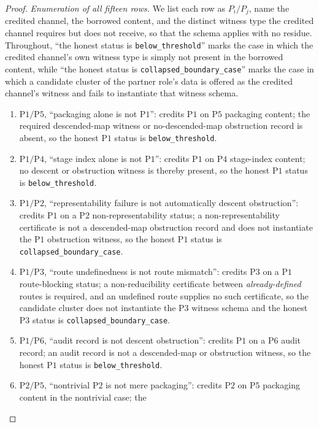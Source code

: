 \documentclass[11pt]{article}
\theoremstyle{definition}
\newcommand{\belowthr}{\texttt{below\_threshold}}
\newcommand{\collapsedbc}{\texttt{collapsed\_boundary\_case}}
\newcommand{\Pone}{\ensuremath{\mathrm{P1}}}
\newcommand{\Ptwo}{\ensuremath{\mathrm{P2}}}
\newcommand{\Pthree}{\ensuremath{\mathrm{P3}}}
\newcommand{\Pfour}{\ensuremath{\mathrm{P4}}}
\newcommand{\Pfive}{\ensuremath{\mathrm{P5}}}
\newcommand{\Psix}{\ensuremath{\mathrm{P6}}}
\begin{document}
\begin{proof}
\emph{Enumeration of all fifteen rows.} We list each row as
\(P_i/P_j\), name the credited channel, the borrowed content, and the
distinct witness type the credited channel requires but does not receive, so
that the schema applies with no residue. Throughout, ``the honest status is
\belowthr{}'' marks the case in which the credited channel's own witness type is
simply not present in the borrowed content, while ``the honest status is
\collapsedbc{}'' marks the case in which a candidate cluster of the partner
role's data is offered as the credited channel's witness and fails to
instantiate that witness schema.
\begin{enumerate}[topsep=2pt,itemsep=2pt,label=\textup{(\arabic*)}]
  \item \(\Pone{}/\Pfive{}\), ``packaging alone is not \Pone{}'': credits
    \Pone{} on \Pfive{} packaging content; the required descended-map witness
    or no-descended-map obstruction record is absent, so the honest \Pone{}
    status is \belowthr{}.
  \item \(\Pone{}/\Pfour{}\), ``stage index alone is not \Pone{}'': credits
    \Pone{} on \Pfour{} stage-index content; no descent or obstruction witness
    is thereby present, so the honest \Pone{} status is \belowthr{}.
  \item \(\Pone{}/\Ptwo{}\), ``representability failure is not automatically
    descent obstruction'': credits \Pone{} on a \Ptwo{} non-representability
    status; a non-representability certificate is not a descended-map
    obstruction record and does not instantiate the \Pone{} obstruction
    witness, so the honest \Pone{} status is \collapsedbc{}.
  \item \(\Pone{}/\Pthree{}\), ``route undefinedness is not route mismatch'':
    credits \Pthree{} on a \Pone{} route-blocking status; a non-reducibility
    certificate between \emph{already-defined} routes is required, and an
    undefined route supplies no such certificate, so the candidate cluster does
    not instantiate the \Pthree{} witness schema and the honest \Pthree{} status
    is \collapsedbc{}.
  \item \(\Pone{}/\Psix{}\), ``audit record is not descent obstruction'':
    credits \Pone{} on a \Psix{} audit record; an audit record is not a
    descended-map or obstruction witness, so the honest \Pone{} status is
    \belowthr{}.
  \item \(\Ptwo{}/\Pfive{}\), ``nontrivial \Ptwo{} is not mere packaging'':
    credits \Ptwo{} on \Pfive{} packaging content in the nontrivial case; the

\end{enumerate}
\end{proof}
\end{document}

